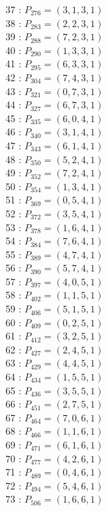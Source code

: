 \documentclass{article}
\begin{document}
{\begin{multicols}{3}
37 : $P_{276}=( 3, 1, 3, 1 )$\\
38 : $P_{283}=( 2, 2, 3, 1 )$\\
39 : $P_{288}=( 7, 2, 3, 1 )$\\
40 : $P_{290}=( 1, 3, 3, 1 )$\\
41 : $P_{295}=( 6, 3, 3, 1 )$\\
42 : $P_{304}=( 7, 4, 3, 1 )$\\
43 : $P_{321}=( 0, 7, 3, 1 )$\\
44 : $P_{327}=( 6, 7, 3, 1 )$\\
45 : $P_{335}=( 6, 0, 4, 1 )$\\
46 : $P_{340}=( 3, 1, 4, 1 )$\\
47 : $P_{343}=( 6, 1, 4, 1 )$\\
48 : $P_{350}=( 5, 2, 4, 1 )$\\
49 : $P_{352}=( 7, 2, 4, 1 )$\\
50 : $P_{354}=( 1, 3, 4, 1 )$\\
51 : $P_{369}=( 0, 5, 4, 1 )$\\
52 : $P_{372}=( 3, 5, 4, 1 )$\\
53 : $P_{378}=( 1, 6, 4, 1 )$\\
54 : $P_{384}=( 7, 6, 4, 1 )$\\
55 : $P_{389}=( 4, 7, 4, 1 )$\\
56 : $P_{390}=( 5, 7, 4, 1 )$\\
57 : $P_{397}=( 4, 0, 5, 1 )$\\
58 : $P_{402}=( 1, 1, 5, 1 )$\\
59 : $P_{406}=( 5, 1, 5, 1 )$\\
60 : $P_{409}=( 0, 2, 5, 1 )$\\
61 : $P_{412}=( 3, 2, 5, 1 )$\\
62 : $P_{427}=( 2, 4, 5, 1 )$\\
63 : $P_{429}=( 4, 4, 5, 1 )$\\
64 : $P_{434}=( 1, 5, 5, 1 )$\\
65 : $P_{436}=( 3, 5, 5, 1 )$\\
66 : $P_{451}=( 2, 7, 5, 1 )$\\
67 : $P_{464}=( 7, 0, 6, 1 )$\\
68 : $P_{466}=( 1, 1, 6, 1 )$\\
69 : $P_{471}=( 6, 1, 6, 1 )$\\
70 : $P_{477}=( 4, 2, 6, 1 )$\\
71 : $P_{489}=( 0, 4, 6, 1 )$\\
72 : $P_{494}=( 5, 4, 6, 1 )$\\
73 : $P_{506}=( 1, 6, 6, 1 )$\\

\end{multicols}}
\end{document}

